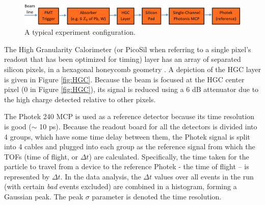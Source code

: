\documentclass[12pt]{article}
\begin{document}
\begin{figure}
\centering
\includegraphics[width=\linewidth]{setup.png}
\caption{A typical experiment configuration.}
\label{fig:setup}
\end{figure}

The High Granularity Calorimeter (or PicoSil when referring to a single pixel’s readout that has been optimized for timing) layer has an array of separated silicon pixels, in a hexagonal honeycomb geometry \cite{P2}. 
A depiction of the HGC layer is given in Figure \ref{fig:HGC}. 
Because the beam is focused at the HGC center pixel (0 in Figure \ref{fig:HGC}), its signal is reduced using a 6 dB attenuator due to the high charge detected relative to other pixels. 

The Photek 240 MCP is used as a reference detector because its time resolution is good ($\sim$ 10 ps). 
Because the readout board for all the detectors is divided into 4 groups, which have some time delay between them, the Photek signal is split into 4 cables and plugged into each group as the reference signal from which the TOFs (time of flight, or $\Delta t$) are calculated. 
Specifically, the time taken for the particle to travel from a device to the reference Photek - the time of flight – is represented by $\Delta t$. 
In the data analysis, the $\Delta t$ values over all events in the run (with certain \textit{bad} events excluded) are combined in a histogram, forming a Gaussian peak. 
The peak $\sigma$ parameter is denoted the time resolution.
\end{document}
